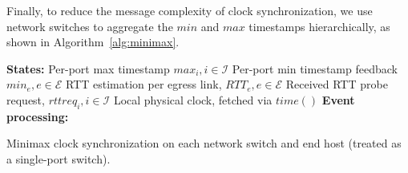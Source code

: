 Finally, to reduce the message complexity of clock synchronization, we use network switches to aggregate the $min$ and $max$ timestamps hierarchically, as shown in Algorithm~\ref{alg:minimax}.

\setlength{\textfloatsep}{0em}
\begin{algorithm}[t]
 \DontPrintSemicolon
 \textbf{States:} Per-port max timestamp $max_i, i \in \mathcal{I}$\;
 	\qquad Per-port min timestamp feedback $min_e, e \in \mathcal{E}$\;
    \qquad RTT estimation per egress link, $RTT_e, e \in \mathcal{E}$\;
    \qquad Received RTT probe request, $rttreq_i, i \in \mathcal{I}$\;
 	\qquad Local physical clock, fetched via $time()$\;
 \textbf{Event processing:}\\
 \caption{Minimax clock synchronization on each network switch and end host (treated as a single-port switch).}
 \label{alg:minimax}
\end{algorithm}



